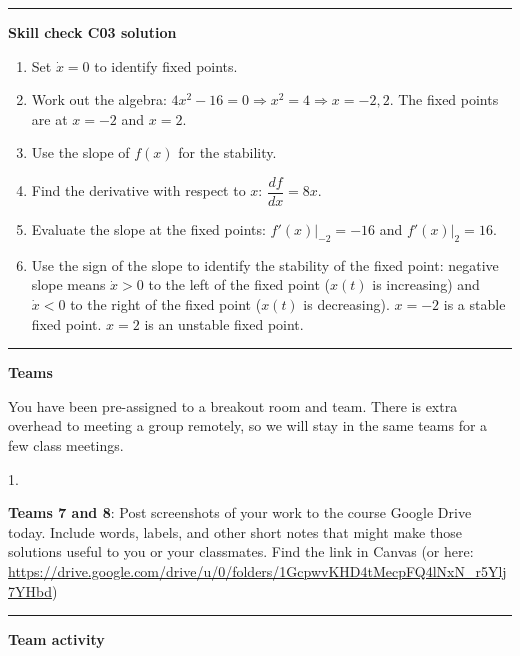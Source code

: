 \documentclass[12pt,letterpaper,noanswers]{exam}
\begin{document}
\vspace{0.2cm}

\hrule
\vspace{0.2cm}
\noindent\textbf{Skill check C03 solution}
\begin{enumerate}
\itemsep-0.3em
    \item Set $\dot{x} = 0$ to identify fixed points.
    \item Work out the algebra: $4x^2 - 16 = 0 \Rightarrow x^2 = 4 \Rightarrow x = -2, 2$.  The fixed points are at $x = -2$ and $x = 2$.
    \item Use the slope of $f(x)$ for the stability.  
    \item Find the derivative with respect to $x$: $\dfrac{df}{dx} = 8x$.
    \item Evaluate the slope at the fixed points: $\left.f'(x)\right\vert_{-2} = -16$ and $\left.f'(x)\right\vert_{2} = 16$.
    \item Use the sign of the slope to identify the stability of the fixed point: negative slope means $\dot x > 0$ to the left of the fixed point ($x(t)$ is increasing) and $\dot x < 0$ to the right of the fixed point ($x(t)$ is decreasing).  $x = -2$ is a stable fixed point.  $x = 2$ is an unstable fixed point.
\end{enumerate}
\vspace{0.2cm}

\hrule
\vspace{0.2cm}


\noindent\textbf{Teams}

You have been pre-assigned to a breakout room and team.  There is extra overhead to meeting a group remotely, so we will stay in the same teams for a few class meetings.

\begin{multicols}{2}
1. 
\end{multicols}

\noindent \textbf{Teams 7 and 8}: Post screenshots of your work to the course Google Drive today.  Include words, labels, and other short notes that might make those solutions useful to you or your classmates.  Find the link in Canvas (or here: \url{https://drive.google.com/drive/u/0/folders/1GcpwvKHD4tMecpFQ4lNxN_r5Ylj7YHbd})
\vspace{0.2cm}

\hrule
\vspace{0.2cm}
\eject

\noindent\textbf{Team activity}
\end{document}
